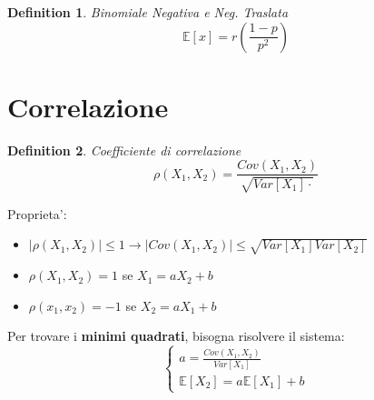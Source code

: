 \documentclass{article}
\newtheorem{definition}{Definition}[section]
\begin{document}
    \begin{definition} Binomiale Negativa e Neg. Traslata
        $$
        \mathbb E[x] = r (\frac {1-p} {p^2})
        $$
    \end{definition}

    \newpage
    \section{Correlazione }
    \begin{definition} Coefficiente di correlazione
        $$
        \rho (X_1, X_2) = \frac {Cov(X_1, X_2)} {\sqrt{Var[X_1] \cdot }}
        $$
    \end{definition}

    Proprieta':
    \begin{itemize}
        \item $|\rho(X_1, X_2)| \leq 1 \to |Cov(X_1, X_2)| \leq \sqrt{Var[X_1]Var[X_2]}$
        \item $\rho(X_1,X_2) = 1$ se $X_1 = a X_2 + b$
        \item $\rho(x_1, x_2) = -1$ se $X_2 = a X_1 + b$
    \end{itemize}

    Per trovare i \textbf{minimi quadrati}, bisogna risolvere il sistema:
    $$
    \begin{cases}
        a = \frac{Cov(X_1, X_2)}{Var[X_1]} \\
        \mathbb E[X_2] = a \mathbb E[X_1] + b
    \end{cases}
    $$
\end{document}
